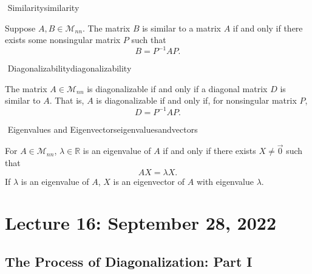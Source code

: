         \begin{definition}{\Stop\,\,Similarity}{similarity}

            Suppose \(A,B\in\mathcal{M}_{nn}\). The matrix \(B\) is similar to a matrix \(A\) if and only if there exists some nonsingular matrix \(P\) such that
            \begin{equation*}
                B=P^{-1}AP.
            \end{equation*}

        \end{definition}
        \begin{definition}{\Stop\,\,Diagonalizability}{diagonalizability}

            The matrix \(A\in\mathcal{M}_{nn}\) is diagonalizable if and only if a diagonal matrix \(D\) is similar to \(A\). That is, \(A\) is diagonalizable if and only if, for nonsingular matrix \(P\),
            \begin{equation*}
                D=P^{-1}AP.
            \end{equation*}
            
        \end{definition}
        \begin{definition}{\Stop\,\,Eigenvalues and Eigenvectors}{eigenvaluesandvectors}

            For \(A\in\mathcal{M}_{nn}\), \(\lambda\in\mathbb{R}\) is an eigenvalue of \(A\) if and only if there exists \(X\neq\vec{0}\) such that
            \begin{equation*}
                AX=\lambda X.
            \end{equation*}
            If \(\lambda\) is an eigenvalue of \(A\), \(X\) is an eigenvector of \(A\) with eigenvalue \(\lambda\).

        \end{definition}

        \pagebreak

\section{Lecture 16: September 28, 2022}

    \subsection{The Process of Diagonalization: Part I}

